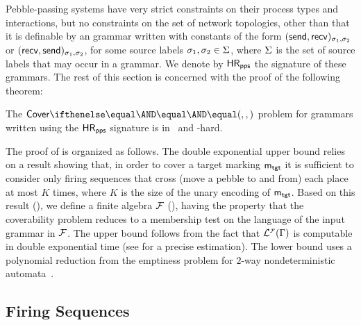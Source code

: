 Pebble-passing systems have very strict constraints on their process
types and interactions, but no constraints on the set of network
topologies, other than that it is definable by an \hrtext{} grammar
written with constants of the form $(\mathsf{send},\mathsf{recv})_{\sigma_1,\sigma_2}$
or $(\mathsf{recv},\mathsf{send})_{\sigma_1,\sigma_2}$, for some source labels
$\sigma_1,\sigma_2 \in \Sigma$, where $\Sigma$ is the set
of source labels that may occur in a grammar. We denote by $\mathsf{HR}_{\mathsf{pps}}$
the signature of these grammars. The rest of this section is concerned
with the proof of the following theorem:

\begin{theorem}\label{thm:pebble-passing}
  The $\paramcover{}{}{}$ problem for grammars written using the
  $\mathsf{HR}_{\mathsf{pps}}$ signature is in \twoexptime\ and \pspace-hard.
\end{theorem}
The proof of  is organized as
follows. The double exponential upper bound relies on a result showing
that, in order to cover a target marking $\mathsf{m}_\mathsf{tgt}$ it is sufficient
to consider only firing sequences that cross (\ie move a pebble to and
from) each place at most $K$ times, where $K$ is the size of the unary
encoding of $\mathsf{m}_\mathsf{tgt}$. Based on this result (),
we define a finite algebra $\mathcal{F}$
(), having the property that the coverability
problem reduces to a membership test on the language of the input
grammar in $\mathcal{F}$. The upper bound follows from the fact that
$\mathcal{L}_{}^{\scriptscriptstyle{\mathcal{F}}}({\Gamma})$ is computable in double exponential
time (see  for a precise estimation). The
lower bound uses a polynomial reduction from the emptiness problem for
$2$-way nondeterministic automata~\cite{2nfa}.


\subsection{Firing Sequences}
\label{sec:pebble-fire-chara}

